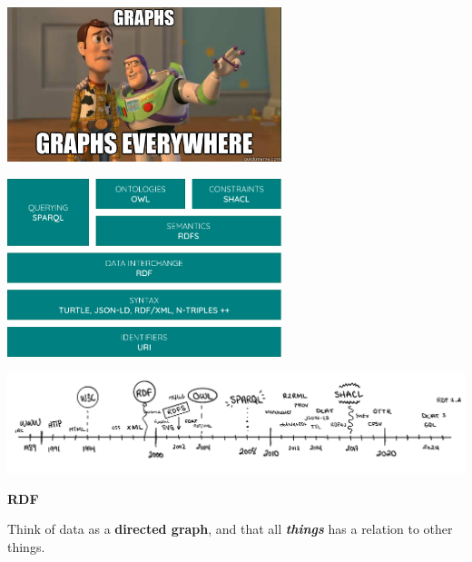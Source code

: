 \documentclass{dt}
\begin{document}
\begin{frame}
\begin{center}
\includegraphics[width=0.6\textwidth]{img/graphs.jpg}
\end{center}
\end{frame}

\begin{frame}
\begin{center}
\includegraphics[width=0.6\textwidth]{img/stack-2.png}
\end{center}
\end{frame}

\begin{frame}
\begin{center}
\includegraphics[width=\textwidth]{img/timeline.png}
\end{center}
\end{frame}


\begin{frame}
\Huge{\textbf{RDF}}
\end{frame}


\begin{frame}
Think of data as a \textbf{directed graph}, and that all \textbf{\textit{things}} has a relation to other things.
\end{frame}
\end{document}
